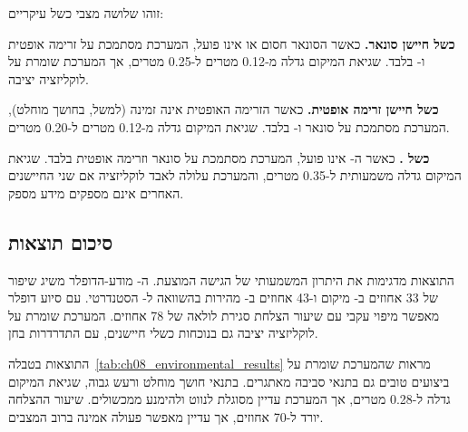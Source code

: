 זוהו שלושה מצבי כשל עיקריים:

\textbf{כשל חיישן סונאר.} כאשר הסונאר חסום או אינו פועל, המערכת מסתמכת על זרימה אופטית ו- בלבד. שגיאת המיקום גדלה מ-0.12 מטרים ל-0.25 מטרים, אך המערכת שומרת על לוקליזציה יציבה.

\textbf{כשל חיישן זרימה אופטית.} כאשר הזרימה האופטית אינה זמינה (למשל, בחושך מוחלט), המערכת מסתמכת על סונאר ו- בלבד. שגיאת המיקום גדלה מ-0.12 מטרים ל-0.20 מטרים.

\textbf{כשל .} כאשר ה- אינו פועל, המערכת מסתמכת על סונאר וזרימה אופטית בלבד. שגיאת המיקום גדלה משמעותית ל-0.35 מטרים, והמערכת עלולה לאבד לוקליזציה אם שני החיישנים האחרים אינם מספקים מידע מספק.

\subsection{סיכום תוצאות}
\label{sec:ch08_summary}

התוצאות מדגימות את היתרון המשמעותי של הגישה המוצעת. ה- מודע-הדופלר משיג שיפור של 33 אחוזים ב- מיקום ו-43 אחוזים ב- מהירות בהשוואה ל- הסטנדרטי.  עם סיוע דופלר מאפשר מיפוי עקבי עם שיעור הצלחת סגירת לולאה של 78 אחוזים. המערכת שומרת על לוקליזציה יציבה גם בנוכחות כשלי חיישנים, עם התדרדרות בחן.

\begin{table}[htbp]
\centering
\caption{תוצאות ניסוי השוואתיות: ביצועי המערכת בתנאי סביבה שונים. (Comparative experimental results: system performance under different environmental conditions.)}
\label{tab:ch08_environmental_results}
\end{table}

התוצאות בטבלה~\ref{tab:ch08_environmental_results} מראות שהמערכת שומרת על ביצועים טובים גם בתנאי סביבה מאתגרים. בתנאי חושך מוחלט ורעש גבוה, שגיאת המיקום גדלה ל-0.28 מטרים, אך המערכת עדיין מסוגלת לנווט ולהימנע ממכשולים. שיעור ההצלחה יורד ל-70 אחוזים, אך עדיין מאפשר פעולה אמינה ברוב המצבים.

